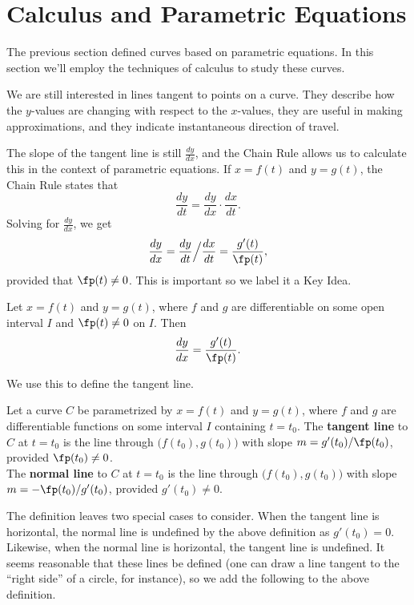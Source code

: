 \section{Calculus and Parametric Equations}\label{sec:par_calc}

The previous section defined curves based on parametric equations. In this section we'll employ the techniques of calculus to study these curves.

We are still interested in lines tangent to points on a curve. They describe how the $y$-values are changing with respect to the $x$-values, they are useful in making approximations, and they indicate instantaneous direction of travel.

The slope of the tangent line is still $\frac{dy}{dx}$, and the Chain Rule allows us to calculate this in the context of parametric equations. If $x=f(t)$ and $y=g(t)$, the Chain Rule states that $$\frac{dy}{dt} = \frac{dy}{dx}\cdot\frac{dx}{dt}.$$
Solving for $\frac{dy}{dx}$, we get 
$$\frac{dy}{dx} = \frac{dy}{dt}\Big/\frac{dx}{dt} = \frac{g'(t)}{\fp(t)},$$
provided that $\fp(t)\neq 0$. This is important so we label it a Key Idea.

{Let $x=f(t)$ and $y=g(t)$, where $f$ and $g$ are differentiable on some open interval $I$ and $\fp(t)\neq 0$ on $I$. Then $$\frac{dy}{dx} = \frac{g'(t)}{\fp(t)}.$$
}

We use this to define the tangent line.

{Let a curve $C$ be parametrized by $x=f(t)$ and $y=g(t)$, where $f$ and $g$ are differentiable functions on some interval $I$ containing $t=t_0$. The \textbf{tangent line} to $C$ at $t=t_0$ is the line through $\big(f(t_0),g(t_0)\big)$ with slope $m=g'(t_0)/\fp(t_0)$, provided $\fp(t_0)\neq 0$.\\

The \textbf{normal line} to $C$ at $t=t_0$ is the line through $\big(f(t_0),g(t_0)\big)$ with slope $m=-\fp(t_0)/g'(t_0)$, provided $g'(t_0)\neq 0$.
}

The definition leaves two special cases to consider. When the tangent line is horizontal, the normal line is undefined by the above definition as $g'(t_0)=0$. Likewise, when the normal line is horizontal, the tangent line is undefined. It seems reasonable that these lines be defined (one can draw a line tangent to the ``right side'' of a circle, for instance), so we add the following to the above definition.

